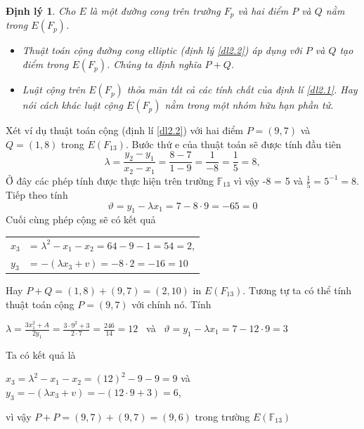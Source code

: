 \documentclass[a4paper,12pt]{report}
\newtheorem{theorem}{Định lý}[chapter]
\begin{document}
\begin{theorem}
Cho $E$ là một đường cong trên trường $F_p$ và hai điểm $P$ và $Q$ nằm trong $E(F_p)$.
\begin{itemize}
\item[(a)] Thuật toán cộng đường cong elliptic (định lý \ref{dl2.2}) áp dụng với $P$ và $Q$ tạo điểm trong $E(F_p)$. Chúng ta định nghĩa $P + Q$.
\item[(b)] Luật cộng trên $E(F_p)$ thỏa mãn tất cả các tính chất của định lí \ref{dl2.1}. Hay nói cách khác luật cộng $E(F_p)$ nằm trong một nhóm hữu hạn phần tử. 
\end{itemize}
\end{theorem}
Xét ví dụ thuật toán cộng (định lí \ref{dl2.2}) với hai điểm $P = (9, 7)$ và $Q = (1, 8)$ trong $E(F_{13})$. Bước thứ e của thuật toán sẽ được tính đầu tiên
\begin{displaymath}
\lambda = \frac{y_2 - y_1}{x_2 - x_1} = \frac{8 - 7}{1 - 9} = \frac{1}{-8} = \frac{1}{5}	= 8,
\end{displaymath}
Ở đây các phép tính được thực hiện trên trường $\mathbb{F}_{13}$ vì vậy -8 = 5 và $\frac{1}{5} = 5^{-1} = 8$. Tiếp theo tính 
\begin{displaymath}
\vartheta = y_1 - \lambda x_1 = 7 - 8\cdot 9 = -65 = 0
\end{displaymath}
Cuối cùng phép cộng sẽ có kết quả
\begin{center}
\begin{tabular}{ll}
$x_3$ & = $\lambda^2 - x_1 - x_2 = 64 - 9 - 1 = 54 = 2$, \\
$y_3$ & = $-(\lambda x_3 + v) = -8\cdot2 = -16 = 10$
\end{tabular}
\end{center}
Hay $P + Q = (1, 8) + (9, 7) = (2, 10)$ in  $E(F_{13})$. Tương tự ta có thể tính thuật toán cộng $P = (9, 7)$ với chính nó. Tính
\begin{center}
$\displaystyle \lambda = \frac{3x_1^2 + A}{2y_1} = \frac{3\cdot9^2 + 3}{2\cdot7} = \frac{246}{14} = 12$ \ và \ $\vartheta = y_1 - \lambda x_1 = 7 - 12\cdot9 = 3$
\end{center}
Ta có kết quả là 
\begin{center}
$x_3 = \lambda^2 - x_1 - x_2 = (12)^2 - 9 - 9 = 9$ và $y_3 = -(\lambda x_3 + v) = -(12\cdot9 + 3) = 6$,
\end{center}
vì vậy $P + P = (9, 7) + (9, 7) = (9,6)$ trong trường $E(\mathbb{F}_{13})$
\end{document}
